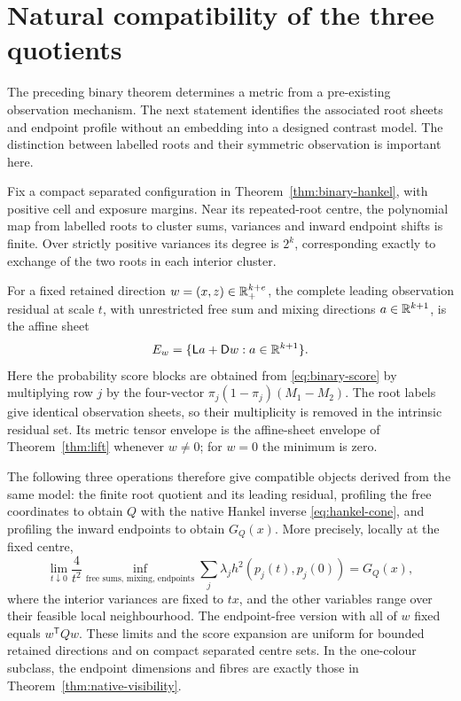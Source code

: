 \section{Natural compatibility of the three quotients}\label{sec:unification}
The preceding binary theorem determines a metric from a pre-existing
observation mechanism. The next statement identifies the associated
root sheets and endpoint profile without an embedding into a designed
contrast model. The distinction between labelled roots and their
symmetric observation is important here.

\begin{theorem}\label{thm:unification}
Fix a compact separated configuration in
Theorem~\ref{thm:binary-hankel}, with positive cell and exposure margins.
Near its repeated-root centre, the polynomial map from labelled roots to
cluster sums, variances and inward endpoint shifts is finite. Over
strictly positive variances its degree is $2^k$, corresponding exactly
to exchange of the two roots in each interior cluster.

For a fixed retained direction $w=(x,z)\in\mathbb R_+^{k+e}$, the complete leading
observation residual at scale $t$, with unrestricted free sum and mixing
directions $a\in\mathbb R^{k+1}$, is the affine sheet
\begin{equation}\label{eq:binary-leading-sheet}
 E_w=\{\mathsf La+\mathsf Dw:a\in\mathbb R^{k+1}\}.
\end{equation}
Here the probability score blocks are obtained from \eqref{eq:binary-score}
by multiplying row $j$ by the four-vector
$\pi_j(1-\pi_j)(M_1-M_2)$. The root labels give identical observation
sheets, so their multiplicity is removed in the intrinsic residual set.
Its metric tensor envelope is the affine-sheet envelope of
Theorem~\ref{thm:lift} whenever $w\ne0$; for $w=0$ the minimum is zero.

The following three operations therefore give compatible objects derived
from the same model: the finite root quotient and its leading residual,
profiling the free coordinates to obtain $Q$ with the native Hankel
inverse \eqref{eq:hankel-cone}, and profiling the inward endpoints to
obtain $G_Q(x)$. More precisely, locally at the fixed centre,
\begin{equation}\label{eq:binary-variational}
 \lim_{t\downarrow0}\frac4{t^2}
 \inf_{\text{free sums, mixing, endpoints}}
 \sum_j\lambda_j h^2(p_j(t),p_j(0))=G_Q(x),
\end{equation}
where the interior variances are fixed to $t x$, and the other variables
range over their feasible local neighbourhood. The endpoint-free version
with all of $w$ fixed equals $w^{\mathsf T}Qw$.
These limits and the score expansion are uniform for bounded retained
directions and on compact separated centre sets. In the one-colour
subclass, the endpoint dimensions and fibres are exactly those in
Theorem~\ref{thm:native-visibility}.
\end{theorem}
